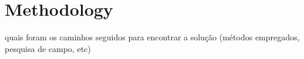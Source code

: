 \section{Methodology}

quais foram os caminhos seguidos para encontrar a solução (métodos empregados, pesquisa de campo, etc)